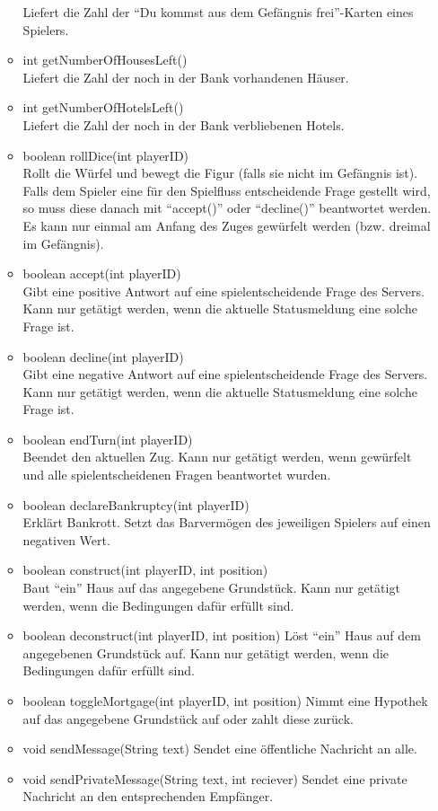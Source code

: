 \documentclass[a4paper,10pt]{article}
\begin{document}
\begin{itemize}
\begin{itemize}
Liefert die Zahl der "`Du kommst aus dem Gefängnis frei"'-Karten eines Spielers.
\item int getNumberOfHousesLeft() \\
Liefert die Zahl der noch in der Bank vorhandenen Häuser.
\item int getNumberOfHotelsLeft() \\
Liefert die Zahl der noch in der Bank verbliebenen Hotels.
\item boolean rollDice(int playerID) \\
Rollt die Würfel und bewegt die Figur (falls sie nicht im Gefängnis ist).
Falls dem Spieler eine für den Spielfluss entscheidende Frage gestellt wird, so muss diese
danach mit "`accept()"' oder "`decline()"' beantwortet
werden. Es kann nur einmal am Anfang des Zuges gewürfelt werden (bzw. dreimal im Gefängnis).
\item boolean accept(int playerID) \\
Gibt eine positive Antwort auf eine spielentscheidende Frage des Servers.
Kann nur getätigt werden, wenn die aktuelle Statusmeldung eine solche
Frage ist.
\item boolean decline(int playerID) \\
Gibt eine negative Antwort auf eine spielentscheidende Frage des Servers.
Kann nur getätigt werden, wenn die aktuelle Statusmeldung eine solche
Frage ist.
\item boolean endTurn(int playerID) \\
Beendet den aktuellen Zug. Kann nur getätigt werden, wenn gewürfelt und
alle spielentscheidenen Fragen beantwortet wurden.
\item boolean declareBankruptcy(int playerID) \\
Erklärt Bankrott. Setzt das Barvermögen des jeweiligen Spielers auf einen negativen Wert.
\item boolean construct(int playerID, int position) \\
Baut "`ein"' Haus auf das angegebene Grundstück. Kann nur getätigt
werden, wenn die Bedingungen dafür erfüllt sind.
\item boolean deconstruct(int playerID, int position)
Löst "`ein"' Haus auf dem angegebenen Grundstück auf. Kann nur
getätigt werden, wenn die Bedingungen dafür erfüllt sind.
\item boolean toggleMortgage(int playerID, int position)
Nimmt eine Hypothek auf das angegebene Grundstück auf oder zahlt diese
zurück.
\item void sendMessage(String text)
Sendet eine öffentliche Nachricht an alle.
\item void sendPrivateMessage(String text, int reciever)
Sendet eine private Nachricht an den entsprechenden Empfänger.
\end{itemize}


\end{itemize}
\end{document}
